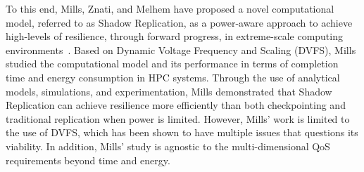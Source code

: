 To this end, Mills, Znati, and Melhem have proposed a novel computational model, referred to as Shadow Replication, as a  
power-aware approach to achieve high-levels of resilience, through forward progress, in extreme-scale computing environments~\cite{mills_2014_icnc,mills_2014_pdp,mills2014power}. Based on Dynamic Voltage Frequency and Scaling (DVFS), Mills studied the computational model and its performance in terms of completion time and energy consumption in HPC systems. Through the use of analytical models, simulations, and experimentation, Mills demonstrated that Shadow Replication can achieve resilience more efficiently than both checkpointing and traditional replication when power is limited. However, Mills' work is limited to the use of DVFS, which has been shown to have multiple issues that questions its viability. In addition, Mills' study is agnostic to the multi-dimensional QoS requirements beyond time and energy.



